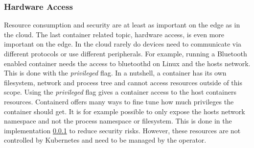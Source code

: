 \subsubsection{Hardware Access}
Resource consumption and security are at least as important on the edge as in the cloud. The last container related topic, hardware access, is even more important on the edge. In the cloud rarely do devices need to communicate via different protocols or use different peripherals. For example, running a Bluetooth enabled container needs the access to bluetoothd on Linux and the hosts network. This is done with the \textit{privileged} flag. In a nutshell, a container has its own filesystem, network and process tree and cannot access resources outside of this scope. Using the \textit{privileged} flag gives a container access to the host containers resources. Containerd offers many ways to fine tune how much privileges the container should get. It is for example possible to only expose the hosts network namespace and not the process namespace or filesystem. This is done in the implementation \cref{} \nameref{} to reduce security risks. However, these resources are not controlled by Kubernetes and need to be managed by the operator.